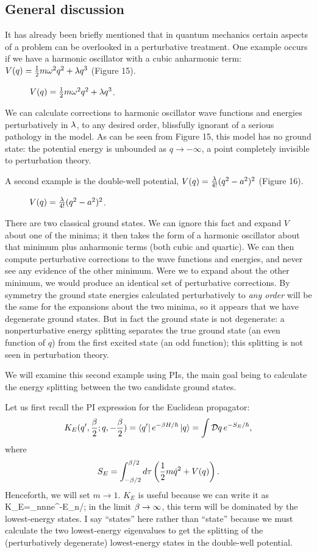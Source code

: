 \documentclass[12pt]{article}
\begin{document}
\subsection{General discussion}
It has already been briefly mentioned that in quantum mechanics 
certain aspects of a problem can be overlooked in a perturbative
treatment. One example occurs if we have a harmonic oscillator with a
cubic anharmonic term: $V(q)={\frac 12} m{\omega}^2 q^2+\lambda q^3$ (Figure 15).

\begin{figure}[hb]
\epsfysize=5cm
\centerline{}
\caption{$V(q)={\frac 12} m{\omega}^2 q^2+\lambda q^3$.}
\end{figure}


We can calculate corrections to harmonic oscillator wave functions
and energies perturbatively in $\lambda$, to any desired
order, blissfully ignorant of a serious pathology in
the model.
As can be seen from Figure 15, this model has no ground state: the
potential energy is unbounded as $q\to-\infty$, a point completely
invisible to perturbation theory.

A second example is the double-well potential,
$V(q)={\lambda\over4!}(q^2-a^2)^2$ (Figure 16).
\begin{figure}[hb]
\epsfysize=4.5cm
\centerline{}
\caption{$V(q)={\lambda\over4!}(q^2-a^2)^2$.}
\end{figure}
There are two classical ground states. We can ignore this fact and
expand $V$ about one of the minima; it then takes the form of
a harmonic oscillator about that minimum plus anharmonic terms
(both cubic and quartic). We can then compute perturbative corrections
to the wave functions and energies, and never see any evidence of the
other minimum. Were we to expand about the other minimum, we would
produce an identical set of perturbative corrections. By symmetry the
ground state energies calculated perturbatively to {\em any order} will
be the same for the expansions about the two minima, so it appears
that we have degenerate ground states. But in fact the ground state is
not degenerate: a  nonperturbative energy splitting separates the true
ground state (an even function of $q$) from the first excited state
(an odd function); this splitting is not seen in perturbation theory.

We will examine this second example using PIs, the main goal being to
calculate the energy splitting between the two candidate ground states.

Let us first recall the PI expression for the Euclidean propagator:
\[
K_E(q',{\be\over2};q,-{\be\over2})=
\bra{q'}e^{-\be H/\hbar}\ket{q}=
\int\DD q\,e^{-S_E/\hbar},
\]
where 
\[
S_E=\int_{-{\beta}/2}^{{\beta}/2}d\tau\left({\frac 12} m{\dot q}^2+V(q)\right).
\]
Henceforth, we will set $m\to1$. $K_E$ is useful because we can write
it as
\beq
K_E=\sum_nn\rangle\langle ne^{-\be E_n/\hbar};
\label{inst1}
\eeq
in the limit ${\beta}\to\infty$, this term will be dominated by the
lowest-energy states. I say ``states'' here rather than ``state''
because we must calculate the two lowest-energy eigenvalues to get
the splitting of the (perturbatively degenerate) lowest-energy states
in the double-well potential.
\end{document}
